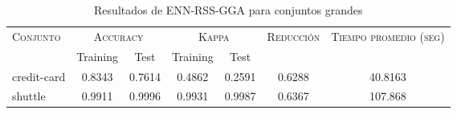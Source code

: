 \begin{table}[]
\centering
\begin{tabular}{l c c c c c c}
\hline
\multirow{2}{*}{\textsc{Conjunto}}
	& \multicolumn{2}{c}{\textsc{Accuracy}}
	& \multicolumn{2}{c}{\textsc{Kappa}}
	& \textsc{Reducción}
	& \textsc{Tiempo promedio (seg)} \\
	& Training & Test
	& Training & Test \\ 
\hline
\hline

credit-card & 0.8343 & 0.7614 & 0.4862 & 0.2591 & 0.6288 & 40.8163 \\
shuttle & 0.9911 & 0.9996 & 0.9931 & 0.9987 & 0.6367 & 107.868 \\

\hline
\end{tabular}
\caption{Resultados de ENN-RSS-GGA para conjuntos grandes }
\label{res-grande-enn-rss-gga}
\end{table}

\clearpage


